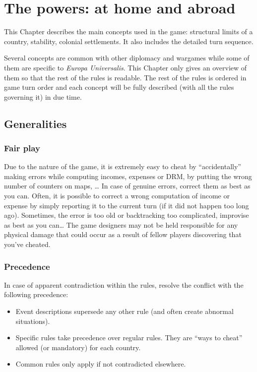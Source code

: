 
\chapter{The powers: at home and abroad}\label{chapter:ThePowers}

\begin{designnote}
  This Chapter describes the main concepts used in the game: structural limits
  of a country, stability, colonial settlements. It also includes the detailed
  turn sequence.

  Several concepts are common with other diplomacy and wargames while some of
  them are specific to \emph{Europa Universalis}. This Chapter only gives an
  overview of them so that the rest of the rules is readable. The rest of the
  rules is ordered in game turn order and each concept will be fully described
  (with all the rules governing it) in due time.
\end{designnote}




\section{Generalities}

\subsection{Fair play}
\aparag Due to the nature of the game, it is extremely easy to cheat by
``accidentally'' making errors while computing incomes, expenses or DRM, by
putting the wrong number of counters on maps, \ldots
\bparag In case of genuine errors, correct them as best as you can. Often, it
is possible to correct a wrong computation of income or expense by simply
reporting it to the current turn (if it did not happen too long
ago). Sometimes, the error is too old or backtracking too complicated,
improvise as best as you can\ldots
\bparag The game designers may not be held responsible for any physical damage
that could occur as a result of fellow players discovering that you've
cheated.

\subsection{Precedence}

\aparag In case of apparent contradiction within the rules, resolve the
conflict with the following precedence:
\begin{itemize}
\item Event descriptions supersede any other rule (and often create abnormal
  situations).
\item Specific rules take precedence over regular rules. They are ``ways to
  cheat'' allowed (or mandatory) for each country.
\item Common rules only apply if not contradicted elsewhere.
\end{itemize}


